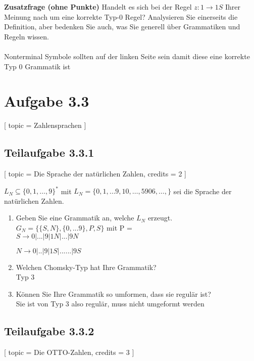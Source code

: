 \documentclass[12pt]{article}
\begin{document}
 \textbf{Zusatzfrage (ohne Punkte)} Handelt es sich bei der Regel $z: 1 \rightarrow 1S$ Ihrer Meinung nach um eine korrekte Typ-0 Regel? Analysieren Sie einerseits die Definition, aber bedenken Sie auch, was Sie generell über Grammatiken und Regeln wissen.  
  \\\\
   Nonterminal Symbole sollten auf der linken Seite sein damit diese eine korrekte Typ 0 Grammatik ist 
  
  
  
 \section*{Aufgabe 3.3} [ 
 topic = Zahlensprachen 
 ] 
  
 \subsection*{Teilaufgabe 3.3.1} [ 
 topic = Die Sprache der natürlichen Zahlen, 
 credits = 2 
 ] 
  
 $L_N \subseteq \{0,1,\ldots,9\}^*$ mit $L_N = \{0, 1, \ldots 9, 10, \ldots, 5906, \ldots, \}$ sei die Sprache der natürlichen Zahlen. 
 \begin{enumerate} 
 \item Geben Sie eine Grammatik an, welche $L_N$ erzeugt.  
 \\
 $G_N = \{\{S,N\},\{0,...9\},P,S\}$ mit P =\\
 
 $S \rightarrow 0|...|9|1N|...|9N$
 
 $N \rightarrow 0|..|9|1S|......|9S$
 \item Welchen Chomsky-Typ hat Ihre Grammatik? \\
 Typ 3
 \item Können Sie Ihre Grammatik so umformen, dass sie regulär ist? \\
 Sie ist von Typ 3 also regulär, muss nicht umgeformt werden
 \end{enumerate}  
  
  
  
  
 \subsection*{Teilaufgabe 3.3.2} [ 
 topic = Die OTTO-Zahlen, 
 credits = 3 
 ] 
  
\end{document}
